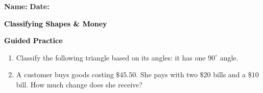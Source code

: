 \documentclass[12pt, letterpaper, fleqn]{article}
\begin{document}
\textbf{Name:} \underline{\hspace{5cm}}
\hfill
\textbf{Date:} \underline{\hspace{3cm}}\\

\begin{tcolorbox}[colback=customteal!20]
    \large\textcolor{black}{\textbf{Classifying Shapes & Money}}
\end{tcolorbox}
\newpage
\begin{tcolorbox}[colback=customteal!20]
    \large\textcolor{black}{\textbf{Guided Practice}}
\end{tcolorbox}
\begin{enumerate}[itemsep=3.5cm, leftmargin=0.6cm]
\item Classify the following triangle based on its angles: it has one $90^\circ$ angle.
\vspace{3cm}
\item A customer buys goods costing $\$45.50$. She pays with two $\$20$ bills and a $\$10$ bill. How much change does she receive?
\end{enumerate}
\end{document}
